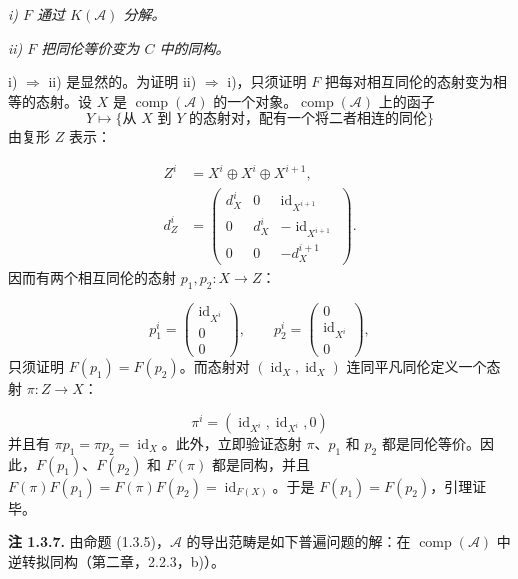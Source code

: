 \clearpage
{}%
\begingroup\small\setlength{\parskip}{0pt}\setlength{\emergencystretch}{1.5em}
\setlength{\abovedisplayskip}{4pt plus 2pt minus 2pt}%
\setlength{\belowdisplayskip}{4pt plus 2pt minus 2pt}%

\noindent\textit{i) $F$ 通过 $K(\mathcal A)$ 分解。}

\noindent\textit{ii) $F$ 把同伦等价变为 $C$ 中的同构。}

i) $\Rightarrow$ ii) 是显然的。为证明 ii) $\Rightarrow$ i)，只须证明
$F$ 把每对相互同伦的态射变为相等的态射。设 $X$ 是
$\operatorname{comp}(\mathcal A)$ 的一个对象。$\operatorname{comp}(\mathcal A)$
上的函子
\[
Y\longmapsto
\{\text{从 $X$ 到 $Y$ 的态射对，配有一个将二者相连的同伦}\}
\]
由复形 $Z$ 表示：

\begin{equation}
\begin{aligned}
Z^i&=X^i\oplus X^i\oplus X^{i+1},\\[2pt]
d_Z^i&=
\begin{pmatrix}
d_X^i&0&\operatorname{id}_{X^{i+1}}\\
0&d_X^i&-\operatorname{id}_{X^{i+1}}\\
0&0&-d_X^{i+1}
\end{pmatrix}.
\end{aligned}
\tag{1.3.6.1}
\end{equation}
因而有两个相互同伦的态射 $p_1,p_2\colon X\longrightarrow Z$：

\begin{equation}
p_1^i=
\begin{pmatrix}
\operatorname{id}_{X^i}\\0\\0
\end{pmatrix},
\qquad
p_2^i=
\begin{pmatrix}
0\\\operatorname{id}_{X^i}\\0
\end{pmatrix},
\tag{1.3.6.2}
\end{equation}
只须证明 $F(p_1)=F(p_2)$。而态射对
$(\operatorname{id}_X,\operatorname{id}_X)$ 连同平凡同伦定义一个态射
$\pi\colon Z\longrightarrow X$：

\begin{equation}
\pi^i=(\operatorname{id}_{X^i},\operatorname{id}_{X^i},0)
\tag{1.3.6.3}
\end{equation}
并且有 $\pi p_1=\pi p_2=\operatorname{id}_X$。此外，立即验证态射
$\pi$、$p_1$ 和 $p_2$ 都是同伦等价。因此，$F(p_1)$、$F(p_2)$ 和
$F(\pi)$ 都是同构，并且
$F(\pi)F(p_1)=F(\pi)F(p_2)=\operatorname{id}_{F(X)}$。于是
$F(p_1)=F(p_2)$，引理证毕。

\medskip\noindent\textbf{注 1.3.7.}\quad
由命题 (1.3.5)，$\mathcal A$ 的导出范畴是如下普遍问题的解：在
$\operatorname{comp}(\mathcal A)$ 中逆转拟同构（第二章，2.2.3，b)）。
\endgroup

